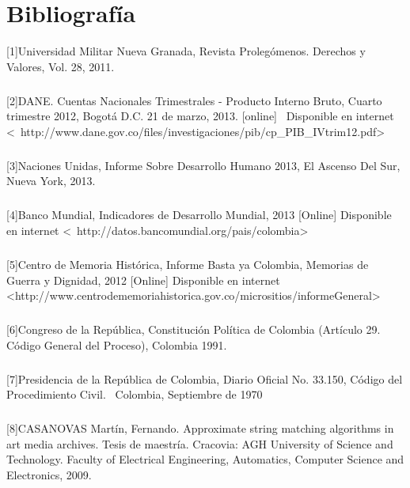 \chapter{Bibliograf\'ia}
\label{sec:biblio}
[1]Universidad Militar Nueva Granada, Revista Proleg\'omenos. Derechos y Valores, Vol. 28, 2011.
\paragraph{}
[2]DANE. Cuentas Nacionales Trimestrales - Producto Interno Bruto, Cuarto trimestre 2012, Bogot\'a D.C. 21 de marzo, 2013. [online]  Disponible en internet 
\textless  http://www.dane.gov.co/files/investigaciones/pib/cp_PIB_IVtrim12.pdf\textgreater
\paragraph{}
[3]Naciones Unidas, Informe Sobre Desarrollo Humano 2013, El Ascenso Del Sur, Nueva York, 2013.
\paragraph{}
[4]Banco Mundial, Indicadores de Desarrollo Mundial, 2013 [Online] Disponible en internet 
\textless  http://datos.bancomundial.org/pais/colombia\textgreater
\paragraph{}
[5]Centro de Memoria Hist\'orica, Informe Basta ya Colombia, Memorias de Guerra y Dignidad, 2012 [Online] Disponible en internet 
\textless http://www.centrodememoriahistorica.gov.co/micrositios/informeGeneral\textgreater
\paragraph{}
[6]Congreso de la Rep\'ublica, Constituci\'on Pol\'itica de Colombia (Art\'iculo 29. C\'odigo General del Proceso), Colombia 1991.
\paragraph{}
[7]Presidencia de la Rep\'ublica de Colombia, Diario Oficial No. 33.150, C\'odigo del Procedimiento Civil.  Colombia, Septiembre de 1970
\paragraph{}
[8]CASANOVAS Mart\'in, Fernando. Approximate string matching algorithms in art media archives.
Tesis de maestr\'ia. Cracovia:  AGH University of Science and Technology.
Faculty of Electrical Engineering, Automatics, Computer Science and Electronics, 2009.

